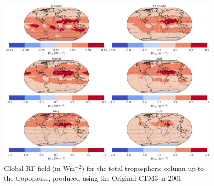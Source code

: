 \begin{figure}[ht]
    \centering
    \includegraphics[width = \linewidth]{Chapter6_Results/images/RF/RF_USE/Appendix/Orig_RF_global_2001.png}
    \caption{Global RF-field (in Wm$^{-2}$) for the total tropospheric column up to the tropopause, produced using the Original CTM3 in 2001}
    \label{fig:orig_RF_global_2001}
\end{figure}